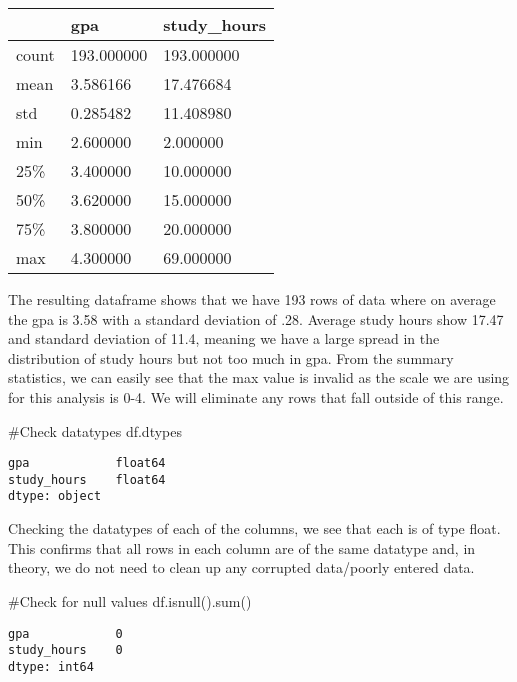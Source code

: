 \documentclass[
  letterpaper,
  DIV=11,
  numbers=noendperiod]{scrreprt}
\newenvironment{Shaded}{\begin{snugshade}}{\end{snugshade}}
\newcommand{\BuiltInTok}[1]{\textcolor[rgb]{0.00,0.23,0.31}{#1}}
\newcommand{\CommentTok}[1]{\textcolor[rgb]{0.37,0.37,0.37}{#1}}
\newcommand{\NormalTok}[1]{\textcolor[rgb]{0.00,0.23,0.31}{#1}}
\begin{document}
\begin{longtable}[]{@{}lll@{}}
\toprule\noalign{}
& gpa & study\_hours \\
\midrule\noalign{}
\endhead
\bottomrule\noalign{}
\endlastfoot
count & 193.000000 & 193.000000 \\
mean & 3.586166 & 17.476684 \\
std & 0.285482 & 11.408980 \\
min & 2.600000 & 2.000000 \\
25\% & 3.400000 & 10.000000 \\
50\% & 3.620000 & 15.000000 \\
75\% & 3.800000 & 20.000000 \\
max & 4.300000 & 69.000000 \\
\end{longtable}

The resulting dataframe shows that we have 193 rows of data where on
average the gpa is 3.58 with a standard deviation of .28. Average study
hours show 17.47 and standard deviation of 11.4, meaning we have a large
spread in the distribution of study hours but not too much in gpa. From
the summary statistics, we can easily see that the max value is invalid
as the scale we are using for this analysis is 0-4. We will eliminate
any rows that fall outside of this range.

\begin{Shaded}
\begin{Highlighting}[]
\CommentTok{\#Check datatypes}
\NormalTok{df.dtypes}
\end{Highlighting}
\end{Shaded}

\begin{verbatim}
gpa            float64
study_hours    float64
dtype: object
\end{verbatim}

Checking the datatypes of each of the columns, we see that each is of
type float. This confirms that all rows in each column are of the same
datatype and, in theory, we do not need to clean up any corrupted
data/poorly entered data.

\begin{Shaded}
\begin{Highlighting}[]
\CommentTok{\#Check for null values}
\NormalTok{df.isnull().}\BuiltInTok{sum}\NormalTok{()}
\end{Highlighting}
\end{Shaded}

\begin{verbatim}
gpa            0
study_hours    0
dtype: int64
\end{verbatim}
\end{document}
